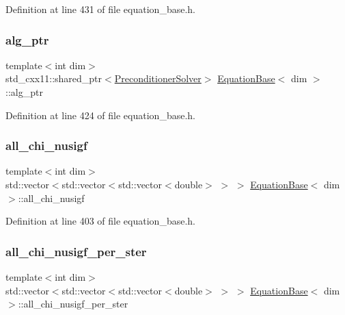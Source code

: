 Definition at line 431 of file equation\+\_\+base.\+h.

\mbox{\label{class_equation_base_aa4b83dfa34d4588cf3250a21ffc2e984}} 
\subsubsection{\texorpdfstring{alg\+\_\+ptr}{alg\_ptr}}
{\footnotesize\ttfamily template$<$int dim$>$ \\
std\+\_\+cxx11\+::shared\+\_\+ptr$<$\hyperlink{class_preconditioner_solver}{Preconditioner\+Solver}$>$ \hyperlink{class_equation_base}{Equation\+Base}$<$ dim $>$\+::alg\+\_\+ptr\hspace{0.3cm}{\ttfamily [private]}}



Definition at line 424 of file equation\+\_\+base.\+h.

\mbox{\label{class_equation_base_ab1bdb760ee1fb27a3e211f5dbdaef83d}} 
\subsubsection{\texorpdfstring{all\+\_\+chi\+\_\+nusigf}{all\_chi\_nusigf}}
{\footnotesize\ttfamily template$<$int dim$>$ \\
std\+::vector$<$std\+::vector$<$std\+::vector$<$double$>$ $>$ $>$ \hyperlink{class_equation_base}{Equation\+Base}$<$ dim $>$\+::all\+\_\+chi\+\_\+nusigf\hspace{0.3cm}{\ttfamily [protected]}}



Definition at line 403 of file equation\+\_\+base.\+h.

\mbox{\label{class_equation_base_a98a7eeab206ded9b3444e074d1f89ea8}} 
\subsubsection{\texorpdfstring{all\+\_\+chi\+\_\+nusigf\+\_\+per\+\_\+ster}{all\_chi\_nusigf\_per\_ster}}
{\footnotesize\ttfamily template$<$int dim$>$ \\
std\+::vector$<$std\+::vector$<$std\+::vector$<$double$>$ $>$ $>$ \hyperlink{class_equation_base}{Equation\+Base}$<$ dim $>$\+::all\+\_\+chi\+\_\+nusigf\+\_\+per\+\_\+ster\hspace{0.3cm}{\ttfamily [protected]}}



